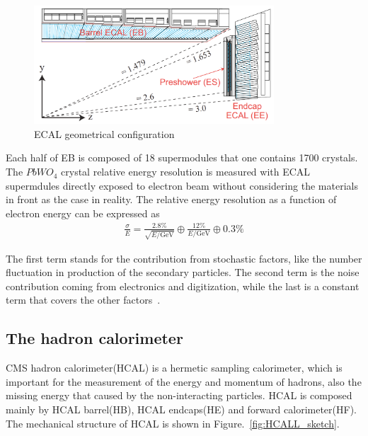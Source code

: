 \begin{figure}[htbp] 
\centering
\includegraphics[width=0.8\textwidth]{chapter3/ECAL_transverse.png}
\caption{ECAL geometrical configuration~\cite{CMS_TDR}}
\label{fig:ECAL_sketch}
\end{figure}

Each half of EB is composed of 18 supermodules that one contains 1700 crystals. The $PbWO_{4}$ crystal relative energy resolution is measured with ECAL supermdules directly exposed to electron beam without considering the materials in front as the case in reality. The relative energy resolution as a function of electron energy can be expressed as 
\begin{align*}
\frac{\sigma}{E}=\frac{2.8\%}{\sqrt{E/\textrm{GeV}}}\oplus\frac{12\%}{E/\textrm{GeV}}\oplus 0.3\%
\end{align*}

The first term stands for the contribution from stochastic factors, like the number fluctuation in production of the secondary particles. The second term is the noise contribution coming from electronics and digitization, while the last is a constant term that covers the other factors~\cite{ECAL_EB_reso}.

\subsection{The hadron calorimeter}

CMS hadron calorimeter(HCAL) is a hermetic sampling calorimeter, which is important for the measurement of the energy and momentum of hadrons, also the missing energy that caused by the non-interacting particles.  HCAL is composed mainly by HCAL barrel(HB), HCAL endcaps(HE) and forward calorimeter(HF). The mechanical structure of HCAL is shown in Figure.~\ref{fig:HCALL_sketch}. 

